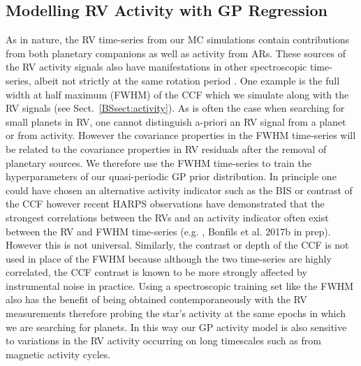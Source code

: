 \subsection{Modelling RV Activity with GP Regression} \label{BSsect:regression}
As in nature, the RV time-series from our MC simulations contain contributions from both planetary companions
as well as activity from ARs. These sources of the RV activity signals also have manifestations in other
spectroscopic time-series, albeit not strictly at the same rotation period \citep{hebrard16}. One example is the
full width at half maximum (FWHM) of the CCF which we simulate along with the RV signals (see Sect.~\ref{BSsect:activity}).
As is often the case when searching for small planets
in RV, one cannot distinguish a-priori an RV signal from a planet or from activity. However the covariance
properties in the FWHM time-series will be related to the covariance properties in RV residuals after the removal
of planetary sources. We therefore use the FWHM time-series to train the hyperparameters of our quasi-periodic
GP prior distribution. In principle one could have chosen an alternative activity indicator such as the BIS or
contrast of the CCF however recent HARPS observations have demonstrated that the strongest correlations between the RVs and
an activity indicator often exist between the RV and FWHM time-series 
(e.g. \citealt{astudillodefru17a}, Bonfils et al. 2017b in prep). However
this is not universal. Similarly, the contrast or depth of the CCF is not used in place
of the FWHM because although the two time-series are highly correlated, the CCF contrast is known to be more strongly
affected by instrumental noise in practice.
Using a spectroscopic training set like the FWHM also has the benefit of being obtained contemporaneously with the
RV measurements therefore probing the star's activity at the same epochs in which we are searching for planets.
In this way our GP activity model is also sensitive to variations in the RV activity occurring on long timescales such as
from magnetic activity cycles. \\


